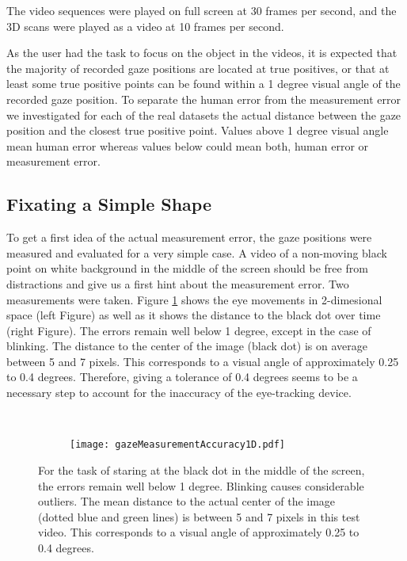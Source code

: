 \noindent The video sequences were played on full screen at 30 frames per second, and the 3D scans were played as a video at 10 frames per second. 

As the user had the task to focus on the object in the videos, it is expected that the majority of recorded gaze positions are located at true positives, or that at least some true positive points can be found within a 1 degree visual angle of the recorded gaze position. 
To separate the human error from the measurement error we investigated for each of the real datasets the actual distance between the gaze position and the closest true positive point. 
Values above 1 degree visual angle mean human error whereas values below could mean both, human error or measurement error. 

\subsection{Fixating a Simple Shape}
To get a first idea of the actual measurement error, the gaze positions were measured and evaluated for a very simple case. 
A video of a non-moving black point on white background in the middle of the screen should be free from distractions and give us a first hint about the measurement error. 
Two measurements were taken. 
Figure \ref{fig:gazeMeasurementAccuracy} shows the eye movements in 2-dimesional space (left Figure) as well as it shows the distance to the black dot over time (right Figure). 
The errors remain well below 1 degree, except in the case of blinking. 
The distance to the center of the image (black dot) is on average between 5 and 7 pixels. 
This corresponds to a visual angle of approximately 0.25 to 0.4 degrees. 
Therefore, giving a tolerance of 0.4 degrees seems to be a necessary step to account for the inaccuracy of the eye-tracking device.

\begin{figure}[ht]
	\centering
	\begin{subfigure}[h]{0.41\textwidth}
	      \setlength{\fboxsep}{0pt}%
	      \setlength{\fboxrule}{0.5pt}%
	      \centering
	\end{subfigure}
	~
	\begin{subfigure}[h]{0.48\textwidth}
		\texttt{[image: gazeMeasurementAccuracy1D.pdf]}	
	\end{subfigure}
	\caption{For the task of staring at the black dot in the middle of the screen, the errors remain well below 1 degree. Blinking causes considerable outliers. The mean distance to the actual center of the image (dotted blue and green lines) is between 5 and 7 pixels in this test video. This corresponds to a visual angle of approximately 0.25 to 0.4 degrees.}
	\label{fig:gazeMeasurementAccuracy}
\end{figure}

